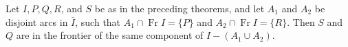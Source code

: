 Let $I, P, Q, R$, and $S$ be as in the preceding theorems, and let $A_1$ and $A_2$ be disjoint arcs in $\bar{I}$, such that $A_1 \cap \operatorname{Fr} I = \{P\}$ and $A_2 \cap \operatorname{Fr} I = \{R\}$. Then $S$ and $Q$ are in the frontier of the same component of $I - (A_1 \cup A_2)$.
